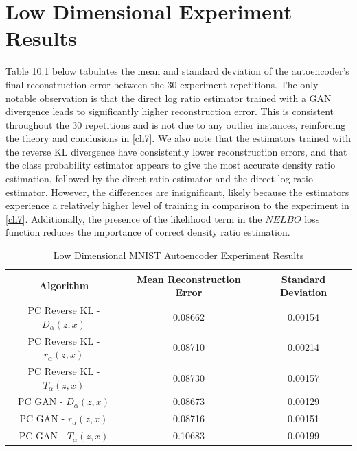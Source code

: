 \documentclass[honours,12pt]{unswthesis}
\numberwithin{equation}{section}
\theoremstyle{definition}
\begin{document}
\section{Low Dimensional Experiment Results}
Table 10.1 below tabulates the mean and standard deviation of the autoencoder's final reconstruction error between the 30 experiment repetitions. The only notable observation is that the direct log ratio estimator trained with a GAN divergence leads to significantly higher reconstruction error. This is consistent throughout the 30 repetitions and is not due to any outlier instances, reinforcing the theory and conclusions in \autoref{ch7}. We also note that the estimators trained with the reverse KL divergence have consistently lower reconstruction errors, and that the class probability estimator appears to give the most accurate density ratio estimation, followed by the direct ratio estimator and the direct log ratio estimator. However, the differences are insignificant, likely because the estimators experience a relatively higher level of training in comparison to the experiment in \autoref{ch7}. Additionally, the presence of the likelihood term in the $NELBO$ loss function reduces the importance of correct density ratio estimation.
\begin{table}[h]
\centering
\begin{tabular}{|c|c|c|}
\hline
Algorithm & Mean Reconstruction Error & Standard Deviation\\
\hline
PC Reverse KL - $D_\alpha(z,x)$ & 0.08662 & 0.00154\\
\hline
PC Reverse KL - $r_\alpha(z,x)$ & 0.08710 & 0.00214\\
\hline
PC Reverse KL - $T_\alpha(z,x)$ & 0.08730 & 0.00157\\
\hline
PC GAN - $D_\alpha(z,x)$ & 0.08673 & 0.00129\\
\hline
PC GAN - $r_\alpha(z,x)$ & 0.08716 & 0.00151\\
\hline
PC GAN - $T_\alpha(z,x)$ & 0.10683 & 0.00199\\
\hline
\end{tabular}
\caption{Low Dimensional MNIST Autoencoder Experiment Results}
\end{table}
\newpage
\end{document}
